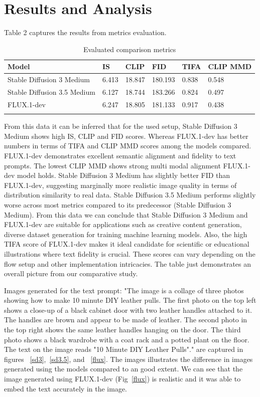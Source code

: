 \documentclass{article}
\begin{document}
\section{Results and Analysis}
Table 2 captures the results from metrics evaluation. 
\begin{table}[H]
	\centering
	\begin{tabular}{p{2in} p{0.5in} p{0.5in} p{0.5in} p{0.5in} p{0.8in}}
		\toprule
		\textbf{Model} & \textbf{IS} & \textbf{CLIP} & \textbf{FID} & \textbf{TIFA} & \textbf{CLIP MMD}\\
		\midrule
		Stable Diffusion 3 Medium & 6.413 & 18.847 & 180.193 & 0.838 & 0.548\\
		Stable Diffusion 3.5 Medium & 6.127 & 18.744 & 183.266 & 0.824 & 0.497\\
		FLUX.1-dev & 6.247 & 18.805 & 181.133 & 0.917 & 0.438\\
		\bottomrule
		\\
	\end{tabular}
	\label{tab:metrics}
	\caption{Evaluated comparison metrics}
\end{table}

From this data it can be inferred that for the used setup, Stable Diffusion 3 Medium shows high IS, CLIP and FID scores. Whereas FLUX.1-dev has better numbers in terms of TIFA and CLIP MMD scores among the models compared. FLUX.1-dev demonstrates excellent semantic alignment and fidelity to text prompts. The lowest CLIP MMD shows strong multi modal alignment FLUX.1-dev model holds. Stable Diffusion 3 Medium has slightly better FID than FLUX.1-dev, suggesting marginally more realistic image quality in terms of distribution similarity to real data. Stable Diffusion 3.5 Medium performs slightly worse across most metrics compared to its predecessor (Stable Diffusion 3 Medium). From this data we can conclude that Stable Diffusion 3 Medium and  FLUX.1-dev are suitable for applications such as creative content generation, diverse dataset generation for training machine learning models. Also, the high TIFA score of FLUX.1-dev makes it ideal candidate for scientific or educational illustrations where text fidelity is crucial. These scores can vary depending on the flow setup and other implementation intricacies. The table just demonstrates an overall picture from our comparative study.\par Images generated for the text prompt: "The image is a collage of three photos showing how to make 10 minute DIY leather pulls. The first photo on the top left shows a close-up of a black cabinet door with two leather handles attached to it. The handles are brown and appear to be made of leather. The second photo in the top right shows the same leather handles hanging on the door. The third photo shows a black wardrobe with a coat rack and a potted plant on the floor. The text on the image reads "10 Minute DIY Leather Pulls"." are captured in figures ~\ref{sd3},~\ref{sd3.5}, and ~\ref{flux}. The images illustrates the difference in images generated using the models compared to an good extent. We can see that the image generated using FLUX.1-dev (Fig~\ref{flux}) is realistic and it was able to embed the text accurately in the image.
\end{document}
